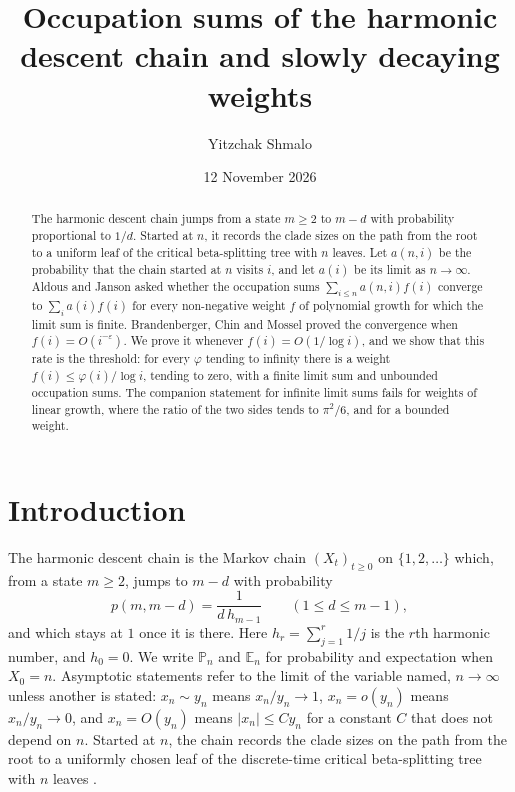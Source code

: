 \documentclass[11pt]{amsart}
\title[Occupation sums and slowly decaying weights]{Occupation sums of the harmonic descent chain and slowly decaying weights}
\author{Yitzchak Shmalo}
\date{12 November 2026}
\theoremstyle{remark}
\numberwithin{equation}{section}
\newcommand{\E}{\mathbb{E}}
\renewcommand{\P}{\mathbb{P}}
\begin{document}
\begin{abstract}
The harmonic descent chain jumps from a state $m\ge2$ to $m-d$ with probability proportional to $1/d$. Started at $n$, it
records the clade sizes on the path from the root to a uniform leaf of the critical beta-splitting tree with $n$ leaves.
Let $a(n,i)$ be the probability that the chain started at $n$ visits $i$, and let $a(i)$ be its limit as $n\to\infty$.
Aldous and Janson asked whether the occupation sums $\sum_{i\le n}a(n,i)f(i)$ converge to $\sum_{i}a(i)f(i)$ for every
non-negative weight $f$ of polynomial growth for which the limit sum is finite. Brandenberger, Chin and Mossel proved
the convergence when $f(i)=O(i^{-\varepsilon})$. We prove it whenever $f(i)=O(1/\log i)$, and we show that this rate is
the threshold: for every $\varphi$ tending to infinity there is a weight $f(i)\le\varphi(i)/\log i$, tending to zero,
with a finite limit sum and unbounded occupation sums. The companion statement for infinite limit sums fails for
weights of linear growth, where the ratio of the two sides tends to $\pi^2/6$, and for a bounded weight.
\end{abstract}

\maketitle

\section{Introduction}\label{sec:intro}

The harmonic descent chain is the Markov chain $(X_t)_{t\ge0}$ on $\{1,2,\dots\}$ which, from a state $m\ge2$, jumps to
$m-d$ with probability
\begin{equation}\label{eq:kernel}
p(m,m-d)=\frac{1}{d\,h_{m-1}}\qquad(1\le d\le m-1),
\end{equation}
and which stays at $1$ once it is there. Here $h_r=\sum_{j=1}^r1/j$ is the $r$th harmonic number, and $h_0=0$. We write
$\P_n$ and $\E_n$ for probability and expectation when $X_0=n$. Asymptotic statements refer to the limit
of the variable named, $n\to\infty$ unless another is stated: $x_n\sim y_n$ means $x_n/y_n\to1$, $x_n=o(y_n)$ means
$x_n/y_n\to0$, and $x_n=O(y_n)$ means $|x_n|\le Cy_n$ for a constant $C$ that does not depend on $n$. Started at $n$, the chain records the clade sizes on the
path from the root to a uniformly chosen leaf of the discrete-time critical beta-splitting tree with $n$ leaves
\cite{AP,AJ,AJL}.
\end{document}
